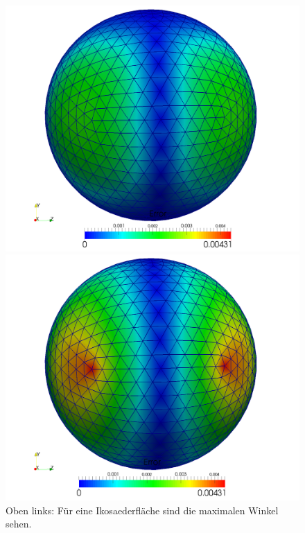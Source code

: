 \begin{figure}
      \begin{minipage}[t]{0.49\textwidth}
        \includegraphics[width=\textwidth]{bilder/laplaceSphere/DECError1k.png}
      \end{minipage}
      \hfill
      \begin{minipage}[t]{0.49\textwidth}
        \includegraphics[width=\textwidth]{bilder/laplaceSphere/FEMError1k.png}
      \end{minipage}
      \caption[Laplace auf Sphäre]{Oben links: Für eine Ikosaederfläche sind die maximalen Winkel sehen.
}
\end{figure}
